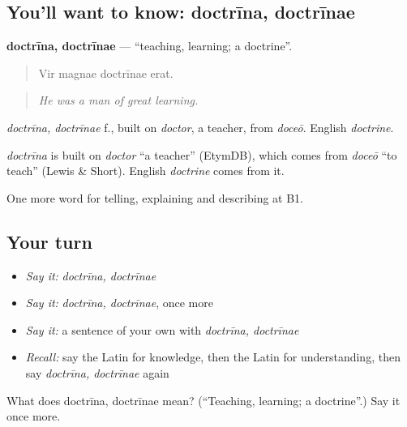\subsection*{You'll want to know: doctrīna, doctrīnae}
\textbf{doctrīna, doctrīnae} — \textquotedblleft{}teaching, learning; a doctrine\textquotedblright{}.

\begin{quote}
Vir magnae doctrīnae erat.
\end{quote}

\begin{quote}
\emph{He was a man of great learning.}
\end{quote}

\emph{doctrīna, doctrīnae} f., built on \emph{doctor}, a teacher, from \emph{doceō}. English \emph{doctrine}.

\begin{cousinweb}
\emph{doctrīna} is built on \emph{doctor} \textquotedblleft{}a teacher\textquotedblright{} (EtymDB), which comes from \emph{doceō} \textquotedblleft{}to teach\textquotedblright{} (Lewis \& Short). English \emph{doctrine} comes from it.
\end{cousinweb}

\begin{grammarlens}[title={What you've built}]
One more word for telling, explaining and describing at B1.
\end{grammarlens}

\subsection*{Your turn}
\begin{itemize}
\raggedright
  \item \emph{Say it:} \emph{doctrīna, doctrīnae}
  \item \emph{Say it:} \emph{doctrīna, doctrīnae}, once more
  \item \emph{Say it:} a sentence of your own with \emph{doctrīna, doctrīnae}
  \item \emph{Recall:} say the Latin for knowledge, then the Latin for understanding, then say \emph{doctrīna, doctrīnae} again
\end{itemize}

\begin{tcolorbox}[breakable,colback=teal!4,colframe=teal!35!black,title={Before you move on}]
What does doctrīna, doctrīnae mean? (\textquotedblleft{}Teaching, learning; a doctrine\textquotedblright{}.) Say it once more.
\end{tcolorbox}
